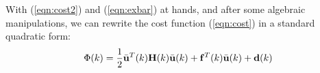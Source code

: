 \documentclass[conference]{IEEEtran} %
\begin{document}
With (\ref{eqn:cost2}) and (\ref{eqn:exbar}) at hands, and after some algebraic manipulations, we can rewrite the cost function (\ref{eqn:cost}) in a standard quadratic form:
\begin{equation}
	\Phi(k) = \frac{1}{2}\bar{\bf u}^T(k){\bf H}(k)\bar{\bf u}(k) + {\bf f}^T(k)\bar{\bf u}(k) + {\bf d}(k)
\end{equation}

%
\end{document}
